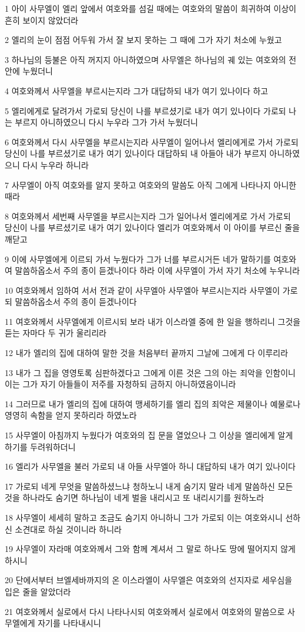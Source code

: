 \par 1 아이 사무엘이 엘리 앞에서 여호와를 섬길 때에는 여호와의 말씀이 희귀하여 이상이 흔히 보이지 않았더라
\par 2 엘리의 눈이 점점 어두워 가서 잘 보지 못하는 그 때에 그가 자기 처소에 누웠고
\par 3 하나님의 등불은 아직 꺼지지 아니하였으며 사무엘은 하나님의 궤 있는 여호와의 전 안에 누웠더니
\par 4 여호와께서 사무엘을 부르시는지라 그가 대답하되 내가 여기 있나이다 하고
\par 5 엘리에게로 달려가서 가로되 당신이 나를 부르셨기로 내가 여기 있나이다 가로되 나는 부르지 아니하였으니 다시 누우라 그가 가서 누웠더니
\par 6 여호와께서 다시 사무엘을 부르시는지라 사무엘이 일어나서 엘리에게로 가서 가로되 당신이 나를 부르셨기로 내가 여기 있나이다 대답하되 내 아들아 내가 부르지 아니하였으니 다시 누우라 하니라
\par 7 사무엘이 아직 여호와를 알지 못하고 여호와의 말씀도 아직 그에게 나타나지 아니한 때라
\par 8 여호와께서 세번째 사무엘을 부르시는지라 그가 일어나서 엘리에게로 가서 가로되 당신이 나를 부르셨기로 내가 여기 있나이다 엘리가 여호와께서 이 아이를 부르신 줄을 깨닫고
\par 9 이에 사무엘에게 이르되 가서 누웠다가 그가 너를 부르시거든 네가 말하기를 여호와여 말씀하옵소서 주의 종이 듣겠나이다 하라 이에 사무엘이 가서 자기 처소에 누우니라
\par 10 여호와께서 임하여 서서 전과 같이 사무엘아 사무엘아 부르시는지라 사무엘이 가로되 말씀하옵소서 주의 종이 듣겠나이다
\par 11 여호와께서 사무엘에게 이르시되 보라 내가 이스라엘 중에 한 일을 행하리니 그것을 듣는 자마다 두 귀가 울리리라
\par 12 내가 엘리의 집에 대하여 말한 것을 처음부터 끝까지 그날에 그에게 다 이루리라
\par 13 내가 그 집을 영영토록 심판하겠다고 그에게 이른 것은 그의 아는 죄악을 인함이니 이는 그가 자기 아들들이 저주를 자청하되 금하지 아니하였음이니라
\par 14 그러므로 내가 엘리의 집에 대하여 맹세하기를 엘리 집의 죄악은 제물이나 예물로나 영영히 속함을 얻지 못하리라 하였노라
\par 15 사무엘이 아침까지 누웠다가 여호와의 집 문을 열었으나 그 이상을 엘리에게 알게 하기를 두려워하더니
\par 16 엘리가 사무엘을 불러 가로되 내 아들 사무엘아 하니 대답하되 내가 여기 있나이다
\par 17 가로되 네게 무엇을 말씀하셨느냐 청하노니 내게 숨기지 말라 네게 말씀하신 모든 것을 하나라도 숨기면 하나님이 네게 벌을 내리시고 또 내리시기를 원하노라
\par 18 사무엘이 세세히 말하고 조금도 숨기지 아니하니 그가 가로되 이는 여호와시니 선하신 소견대로 하실 것이니라 하니라
\par 19 사무엘이 자라매 여호와께서 그와 함께 계셔서 그 말로 하나도 땅에 떨어지지 않게 하시니
\par 20 단에서부터 브엘세바까지의 온 이스라엘이 사무엘은 여호와의 선지자로 세우심을 입은 줄을 알았더라
\par 21 여호와께서 실로에서 다시 나타나시되 여호와께서 실로에서 여호와의 말씀으로 사무엘에게 자기를 나타내시니

